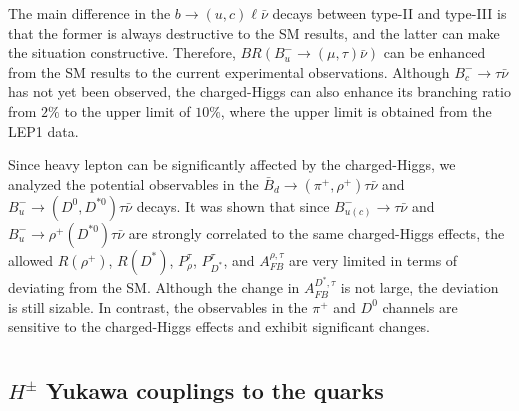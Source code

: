 \documentclass[prd,preprint,superscriptaddress,amsmath,amssymb]{revtex4}
\begin{document}
  
 The main difference in the $b \to (u,c) \ell \bar\nu$ decays between type-II and type-III is that the former is always destructive to the SM results, and the latter can make the situation  constructive. Therefore,  $BR(B^-_u \to (\mu, \tau) \bar \nu)$  can be enhanced from the SM results to  the current experimental observations. Although $B^-_c \to \tau \bar\nu$ has not yet  been observed, the charged-Higgs can also enhance its branching ratio from $2\%$ to the upper limit of $10\%$, where the upper limit is  obtained from the LEP1 data. 
  
  Since heavy lepton can be significantly affected by the charged-Higgs, we analyzed the potential observables in the $\bar B_d \to (\pi^+, \rho^+) \tau \bar \nu$ and $B^-_u \to (D^0, D^{*0}) \tau \bar\nu$ decays. It was shown that since $B^-_{u(c)} \to \tau \bar\nu$ and $B^-_{u} \to \rho^+ (D^{*0}) \tau \bar\nu$ are strongly correlated to the same charged-Higgs effects, the allowed  $R(\rho^+)$, $R(D^*)$, $P^{\tau}_{\rho}$, $P^{\tau}_{D^*}$, and $A^{\rho,\tau}_{FB}$  are very limited in terms of  deviating from the SM. Although the change in $A^{D^*,\tau}_{FB}$ is not large, the deviation is still sizable.  In contrast, the observables in the $\pi^+$ and $D^0$ channels are sensitive to the charged-Higgs effects and exhibit significant changes. \\
  
  
  
  
  
  
\appendix 
\section{}
 
 \subsection{$H^\pm$ Yukawa couplings to the quarks}
 
\end{document}
